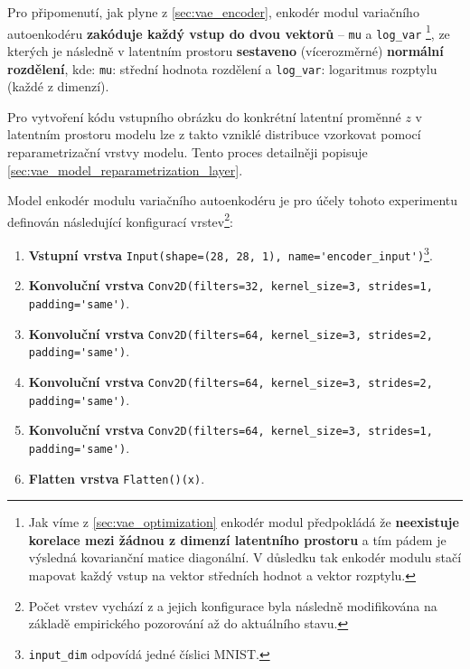 Pro připomenutí, jak plyne z \autoref{sec:vae_encoder}, enkodér modul variačního autoenkodéru \textbf{zakóduje každý vstup do dvou vektorů} – \lstinline{mu} a \lstinline{log_var}
\footnote{Jak víme z \autoref{sec:vae_optimization} enkodér modul předpokládá že \textbf{neexistuje korelace mezi žádnou z dimenzí latentního prostoru} a tím pádem je výsledná kovarianční matice diagonální. V důsledku tak enkodér modulu stačí mapovat každý vstup na vektor středních hodnot a vektor rozptylu.},
ze kterých je následně v latentním prostoru \textbf{sestaveno} (vícerozměrné) \textbf{normální rozdělení}, kde:
\lstinline{mu}: střední hodnota rozdělení a \lstinline{log_var}: logaritmus rozptylu (každé z dimenzí).

Pro vytvoření kódu vstupního obrázku do konkrétní latentní proměnné $z$ v latentním prostoru modelu lze z takto vzniklé distribuce vzorkovat pomocí reparametrizační vrstvy modelu. Tento proces detailněji popisuje \autoref{sec:vae_model_reparametrization_layer}.

Model enkodér modulu variačního autoenkodéru je pro účely tohoto experimentu definován následující konfigurací vrstev\footnote{Počet vrstev vychází z \textcite{Kingma2014} a jejich konfigurace byla následně modifikována na základě empirického pozorování až do aktuálního stavu.}:
\newpage
\begin{enumerate}
    \item \textbf{Vstupní vrstva} \lstinline{Input(shape=(28, 28, 1), name='encoder_input')}\footnote{\lstinline{input_dim} odpovídá jedné číslici MNIST.}.
    \item \textbf{Konvoluční vrstva} \lstinline{Conv2D(filters=32, kernel_size=3, strides=1, padding='same')}.
    \item \textbf{Konvoluční vrstva} \lstinline{Conv2D(filters=64, kernel_size=3, strides=2, padding='same')}.
    \item \textbf{Konvoluční vrstva} \lstinline{Conv2D(filters=64, kernel_size=3, strides=2, padding='same')}.
    \item \textbf{Konvoluční vrstva} \lstinline{Conv2D(filters=64, kernel_size=3, strides=1, padding='same')}.
    \item \textbf{Flatten vrstva} \lstinline{Flatten()(x)}.
\end{enumerate}

